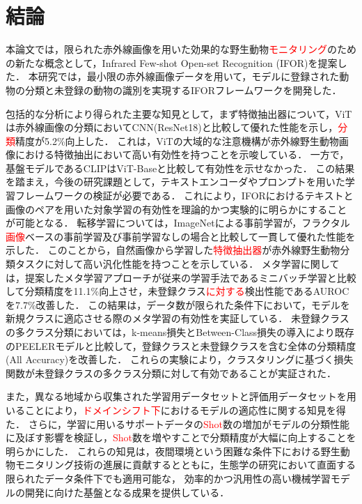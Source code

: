 \documentclass[a4paper,11pt,nomag]{jsreport}
\begin{document}
\setcounter{chapter}{5}

\chapter*{結論}

本論文では，限られた赤外線画像を用いた効果的な野生動物\textcolor{red}{モニタリング}のための新たな概念として，Infrared Few-shot Open-set Recognition (IFOR)を提案した．
本研究では，最小限の赤外線画像データを用いて，モデルに登録された動物の分類と未登録の動物の識別を実現するIFORフレームワークを開発した．

包括的な分析により得られた主要な知見として，まず特徴抽出器について，ViTは赤外線画像の分類においてCNN(ResNet18)と比較して優れた性能を示し，\textcolor{red}{分類}精度が5.2\%向上した．
これは，ViTの大域的な注意機構が赤外線野生動物画像における特徴抽出において高い有効性を持つことを示唆している．
一方で，基盤モデルであるCLIPはViT-Baseと比較して有効性を示せなかった．
この結果を踏まえ，今後の研究課題として，テキストエンコーダやプロンプトを用いた学習フレームワークの検証が必要である．
これにより，IFORにおけるテキストと画像のペアを用いた対象学習の有効性を理論的かつ実験的に明らかにすることが可能となる．
転移学習については，ImageNetによる事前学習が，フラクタル\textcolor{red}{画像}ベースの事前学習及び事前学習なしの場合と比較して一貫して優れた性能を示した．
このことから，自然画像から学習した\textcolor{red}{特徴抽出器}が赤外線野生動物分類タスクに対して高い汎化性能を持つことを示している．
メタ学習に関しては，提案したメタ学習アプローチが従来の学習手法であるミニバッチ学習と比較して分類精度を11.1\%向上させ，未登録クラス\textcolor{red}{に対する}検出性能であるAUROCを7.7\%改善した．
この結果は，データ数が限られた条件下において，モデルを新規クラスに適応させる際のメタ学習の有効性を実証している．
未登録クラスの多クラス分類においては，k-means損失とBetween-Class損失の導入により既存のPEELERモデルと比較して，登録クラスと未登録クラスを含む全体の分類精度(All Accuracy)を改善した．
これらの実験により，クラスタリングに基づく損失関数が未登録クラスの多クラス分類に対して有効であることが実証された．

また，異なる地域から収集された学習用データセットと評価用データセットを用いることにより，\textcolor{red}{ドメインシフト下}におけるモデルの適応性に関する知見を得た．
さらに，学習に用いるサポートデータの\textcolor{red}{Shot}数の増加がモデルの分類性能に及ぼす影響を検証し，\textcolor{red}{Shot}数を増やすことで分類精度が大幅に向上することを明らかにした．
これらの知見は，夜間環境という困難な条件下における野生動物モニタリング技術の進展に貢献するとともに，生態学の研究において直面する限られたデータ条件下でも適用可能な，
効率的かつ汎用性の高い機械学習モデルの開発に向けた基盤となる成果を提供している．
\end{document}
